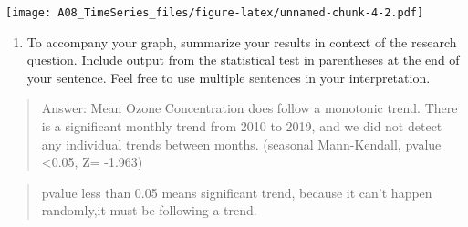 \documentclass[]{article}
\providecommand{\tightlist}{%
  \setlength{\itemsep}{0pt}\setlength{\parskip}{0pt}}
\begin{document}
\texttt{[image: A08\_TimeSeries\_files/figure-latex/unnamed-chunk-4-2.pdf]}

\begin{enumerate}
\def\labelenumi{\arabic{enumi}.}
\setcounter{enumi}{13}
\tightlist
\item
  To accompany your graph, summarize your results in context of the
  research question. Include output from the statistical test in
  parentheses at the end of your sentence. Feel free to use multiple
  sentences in your interpretation.
\end{enumerate}

\begin{quote}
Answer: Mean Ozone Concentration does follow a monotonic trend. There is
a significant monthly trend from 2010 to 2019, and we did not detect any
individual trends between months. (seasonal Mann-Kendall, pvalue
\textless{}0.05, Z= -1.963)
\end{quote}

\begin{quote}
pvalue less than 0.05 means significant trend, because it can't happen
randomly,it must be following a trend.
\end{quote}
\end{document}
